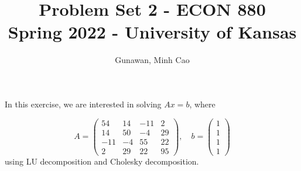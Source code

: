 \documentclass[11pt]{article}
\title{Problem Set 2 - ECON 880\\
	\small Spring 2022 - University of Kansas}
\author{Gunawan, Minh Cao}
\newcommand{\1}{\mathbbm{1}}
\begin{document}
\maketitle	

In this exercise, we are interested in solving $Ax=b$, where

\[A = \begin{pmatrix}
		54 &14& -11& 2 \\ 14 &50& -4& 29 \\ -11 &-4 &55& 22 \\ 2& 29& 22& 95
\end{pmatrix}, \quad b = \begin{pmatrix}
1\\1\\1\\1
\end{pmatrix} \]
using LU decomposition and Cholesky decomposition. 
\end{document}
